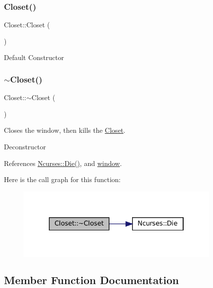 \subsubsection{\texorpdfstring{Closet()}{Closet()}}
{\footnotesize\ttfamily Closet\+::\+Closet (\begin{DoxyParamCaption}{ }\end{DoxyParamCaption})}

Default Constructor \mbox{\label{classCloset_a5afebda9b625af231a1d980ff851b2a3}} 
\subsubsection{\texorpdfstring{$\sim$\+Closet()}{~Closet()}}
{\footnotesize\ttfamily Closet\+::$\sim$\+Closet (\begin{DoxyParamCaption}{ }\end{DoxyParamCaption})\hspace{0.3cm}{\ttfamily [virtual]}}



Closes the window, then kills the \mbox{\hyperlink{classCloset}{Closet}}. 

Deconstructor 

References \mbox{\hyperlink{classNcurses_af9467a004e66043d4dbe540e24524f1f}{Ncurses\+::\+Die()}}, and \mbox{\hyperlink{classCloset_af1eb4f786cc4eccd3018b90632236a93}{window}}.

Here is the call graph for this function\+:\nopagebreak
\begin{figure}[H]
\begin{center}
\leavevmode
\includegraphics[width=286pt]{classCloset_a5afebda9b625af231a1d980ff851b2a3_cgraph}
\end{center}
\end{figure}


\subsection{Member Function Documentation}
\mbox{\label{classCloset_ad81782f2bb110f3a0a635a5ac1f929eb}} 
